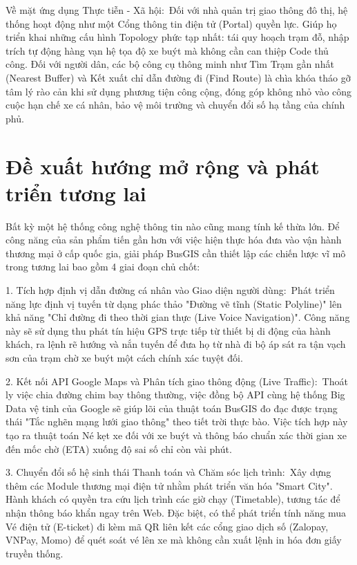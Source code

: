 \documentclass[13pt,a4paper]{report}
\begin{document}
Về mặt ứng dụng Thực tiễn - Xã hội: Đối với nhà quản trị giao thông đô thị, hệ thống hoạt động như một Cổng thông tin điện tử (Portal) quyền lực. Giúp họ triển khai những cấu hình Topology phức tạp nhất: tái quy hoạch trạm đỗ, nhập trích tự động hàng vạn hệ tọa độ xe buýt mà không cần can thiệp Code thủ công. Đối với người dân, các bộ công cụ thông minh như Tìm Trạm gần nhất (Nearest Buffer) và Kết xuất chỉ dẫn đường đi (Find Route) là chìa khóa tháo gỡ tâm lý rào cản khi sử dụng phương tiện công cộng, đóng góp không nhỏ vào công cuộc hạn chế xe cá nhân, bảo vệ môi trường và chuyển đổi số hạ tầng của chính phủ.

\section{Đề xuất hướng mở rộng và phát triển tương lai}

Bất kỳ một hệ thống công nghệ thông tin nào cũng mang tính kế thừa lớn. Để công năng của sản phẩm tiến gần hơn với việc hiện thực hóa đưa vào vận hành thương mại ở cấp quốc gia, giải pháp BusGIS cần thiết lập các chiến lược vĩ mô trong tương lai bao gồm 4 giai đoạn chủ chốt:

1. Tích hợp định vị dẫn đường cá nhân vào Giao diện người dùng: Phát triển năng lực định vị tuyến từ dạng phác thảo "Đường vẽ tĩnh (Static Polyline)" lên khả năng "Chỉ đường đi theo thời gian thực (Live Voice Navigation)". Công năng này sẽ sử dụng thu phát tín hiệu GPS trực tiếp từ thiết bị di động của hành khách, ra lệnh rẽ hướng và nắn tuyến để đưa họ từ nhà đi bộ áp sát ra tận vạch sơn của trạm chờ xe buýt một cách chính xác tuyệt đối.

2. Kết nối API Google Maps và Phân tích giao thông động (Live Traffic): Thoát ly việc chia đường chim bay thông thường, việc đồng bộ API cùng hệ thống Big Data vệ tinh của Google sẽ giúp lõi của thuật toán BusGIS đo đạc được trạng thái "Tắc nghẽn mạng lưới giao thông" theo tiết trời thực bào. Việc tích hợp này tạo ra thuật toán Né kẹt xe đối với xe buýt và thông báo chuẩn xác thời gian xe đến mốc chờ (ETA) xuống độ sai số chỉ còn vài phút.

3. Chuyển đổi số hệ sinh thái Thanh toán và Chăm sóc lịch trình: Xây dựng thêm các Module thương mại điện tử nhằm phát triển văn hóa "Smart City". Hành khách có quyền tra cứu lịch trình các giờ chạy (Timetable), tương tác để nhận thông báo khẩn ngay trên Web. Đặc biệt, có thể phát triển tính năng mua Vé điện tử (E-ticket) đi kèm mã QR liên kết các cổng giao dịch số (Zalopay, VNPay, Momo) để quét soát vé lên xe mà không cần xuất lệnh in hóa đơn giấy truyền thống.
\end{document}
